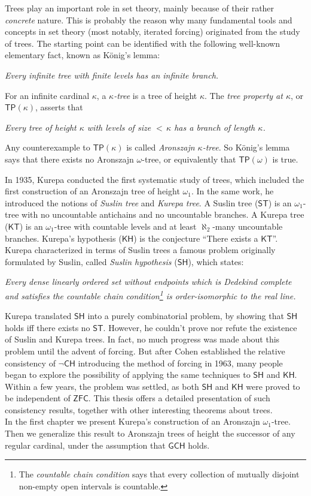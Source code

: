 \documentclass[11pt,a4paper]{report}
\theoremstyle{definition}
\theoremstyle{num.custom-title}
\theoremstyle{custom-title}
\newcommand{\ZFC}{\ensuremath{\mathsf{ZFC}}\xspace}
\newcommand{\TP}{\ensuremath{\mathsf{TP}}\xspace}
\newcommand{\GCH}{\ensuremath{\mathsf{GCH}}\xspace}
\newcommand{\CH}{\ensuremath{\mathsf{CH}}\xspace}
\newcommand{\SH}{\ensuremath{\mathsf{SH}}\xspace}
\newcommand{\ST}{\ensuremath{\mathsf{ST}}\xspace}
\newcommand{\KT}{\ensuremath{\mathsf{KT}}\xspace}
\newcommand{\KH}{\ensuremath{\mathsf{KH}}\xspace}
\begin{document}
Trees play an important role in set theory, mainly because of their rather \emph{concrete} nature. This is probably the reason why many fundamental tools and concepts in set theory (most notably, iterated forcing) originated from the study of trees. The starting point can be identified with the following well-known elementary fact, known as König's lemma:
\begin{center}
\emph{Every infinite tree with finite levels has an infinite branch.}
\end{center}
For an infinite cardinal $\kappa$, a \emph{$\kappa$-tree} is a tree of height $\kappa$. The \emph{tree property at $\kappa$}, or $\TP(\kappa)$, asserts that
\begin{center}
\emph{Every tree of height $\kappa$ with levels of size ${<} \, \kappa$ has a branch of length $\kappa$.}
\end{center}
Any counterexample to $\TP(\kappa)$ is called \emph{Aronszajn $\kappa$-tree}. So König's lemma says that there exists no Aronszajn $\omega$-tree, or equivalently that $\TP(\omega)$ is true.

In 1935, Kurepa conducted the first systematic study of trees, which included the first construction of an Aronszajn tree of height $\omega_1$. In the same work, he introduced the notions of \emph{Suslin tree} and \emph{Kurepa tree}. A Suslin tree (\ST) is an $\omega_1$-tree with no uncountable antichains and no uncountable branches. A Kurepa tree (\KT) is an $\omega_1$-tree with countable levels and at least $\aleph_2$-many uncountable branches. Kurepa's hypothesis (\KH) is the conjecture ``There exists a \KT''. Kurepa characterized in terms of Suslin trees a famous problem originally formulated by Suslin, called \emph{Suslin hypothesis} (\SH), which states:
\begin{center}
\emph{Every dense linearly ordered set without endpoints which is Dedekind complete and satisfies the countable chain condition\footnote{The \emph{countable chain condition} says that every collection of mutually disjoint non-empty open intervals is countable.} is order-isomorphic to the real line.}
\end{center}
Kurepa translated \SH into a purely combinatorial problem, by showing that \SH holds iff there exists no \ST. However, he couldn't prove nor refute the existence of Suslin and Kurepa trees. In fact, no much progress was made about this problem until the advent of forcing. But after Cohen established the relative consistency of $\neg\CH$ introducing the method of forcing in 1963, many people began to explore the possibility of applying the same techniques to \SH and \KH. Within a few years, the problem was settled, as both \SH and \KH were proved to be independent of \ZFC. This thesis offers a detailed presentation of such consistency results, together with other interesting theorems about trees.
\\[10pt]
\indent In the first chapter we present Kurepa's construction of an Aronszajn $\omega_1$-tree. Then we generalize this result to Aronszajn trees of height the successor of any regular cardinal, under the assumption that \GCH holds.
\end{document}
